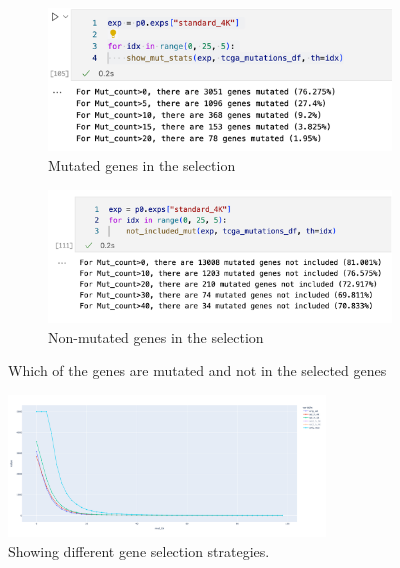 \begin{figure}[!htb]
    \captionsetup[subfigure]{justification=Centering}
    \begin{subfigure}[!t]{0.75\textwidth}
        \includegraphics[width=\textwidth]{Sections/Network_I/Resources/Gene_selection/included_mut.png}
        \caption{Mutated genes in the selection}
    \end{subfigure}\hspace{\fill} %

    \bigskip %
    \begin{subfigure}[!t]{0.75\textwidth}
        \includegraphics[width=\linewidth]{Sections/Network_I/Resources/Gene_selection/not_included_mut.png}
        \caption{Non-mutated genes in the selection}
    \end{subfigure}\hspace{\fill} %

    \caption{Which of the genes are mutated and not in the selected genes}
    \label{fig:N_I:gene_sel}
\end{figure}


\begin{figure}[!htb]
    \centering\includegraphics[width=0.75\textwidth,height=0.75\textheight,keepaspectratio]{Sections/Network_I/Resources/Gene_selection/GeneSelection_strategies.png}
    \caption{Showing different gene selection strategies.}
    \label{fig:N_I:gene_sel_strategies}
\end{figure}


